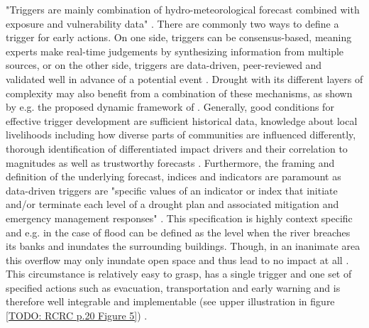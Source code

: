 "Triggers are mainly combination of hydro-meteorological forecast combined with exposure and vulnerability data" \autocite[19]{rcrcFORECASTBASEDFINANCINGEARLY2020}. There are commonly two ways to define a trigger for early actions. On one side, triggers can be consensus-based, meaning experts make real-time judgements by synthesizing information from multiple sources, or on the other side, triggers are data-driven, peer-reviewed and validated well in advance of a potential event \autocite{rcrcFORECASTBASEDFINANCINGEARLY2020}. Drought with its different layers of complexity may also benefit from a combination of these mechanisms, as shown by e.g. the proposed dynamic framework of \autocite{boultDroughtImpactbasedForecasting2022}. Generally, good conditions for effective trigger development are sufficient historical data, knowledge about local livelihoods including how diverse parts of communities are influenced differently, thorough identification of differentiated impact drivers and their correlation to magnitudes as well as trustworthy forecasts \autocite{coughlandeperezForecastbasedFinancingApproach2015,coughlandeperezActionbasedFloodForecasting2016,elisabethstephensFORECASTBASEDACTION2015,harrowsmithFutureForecastImpact2020,rcrcFORECASTBASEDFINANCINGEARLY2020}.\newline
Furthermore, the framing and definition of the underlying forecast, indices and indicators are paramount as data-driven triggers are "specific values of an indicator or index that initiate and/or terminate each level of a drought plan and associated mitigation and emergency management responses" \autocites{rcrcFORECASTBASEDFINANCINGEARLY2020}[13]{svobodaHandbookDroughtIndicators2016}. This specification is highly context specific and e.g. in the case of flood can be defined as the level when the river breaches its banks and inundates the surrounding buildings. Though, in an inanimate area this overflow may only inundate open space and thus lead to no impact at all \autocite{elisabethstephensFORECASTBASEDACTION2015}. This circumstance is relatively easy to grasp, has a single trigger and one set of specified actions such as evacuation, transportation and early warning and is therefore well integrable and implementable (see upper illustration in figure \ref{TODO: RCRC p.20 Figure 5}) \autocite{siahaanForecastbasedActionDREF2018}. 



